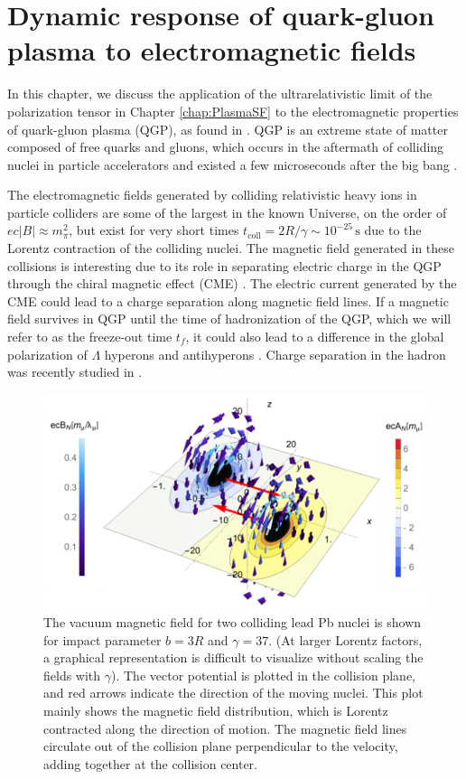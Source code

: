 \section{Dynamic response of quark-gluon plasma to electromagnetic fields}\label{chap:QCD}

 In this chapter, we discuss the application of the ultrarelativistic limit of the polarization tensor in Chapter \ref{chap:PlasmaSF} to the electromagnetic properties of quark-gluon plasma (QGP), as found in \cite{Grayson:2022asf}. QGP is an extreme state of matter composed of free quarks and gluons, which occurs in the aftermath of colliding nuclei in particle accelerators and existed a few microseconds after the big bang \cite{Letessier:2002ony}. 

The electromagnetic fields generated by colliding relativistic heavy ions in particle colliders are some of the largest in the known Universe, on the order of $ec|B| \approx m_\pi^2$, but exist for very short times $t_{\text{coll}}= 2 R/\gamma \sim 10^{-25}\,\textrm{s}$ due to the Lorentz contraction of the colliding nuclei. The magnetic field generated in these collisions is interesting due to its role in separating electric charge in the QGP through the chiral magnetic effect (CME) \cite{Kharzeev:2007jp}. The electric current generated by the CME could lead to a charge separation along magnetic field lines. If a magnetic field survives in QGP until the time of hadronization of the QGP, which we will refer to as the freeze-out time $t_f$, it could also lead to a difference in the global polarization of $\Lambda$ hyperons and antihyperons \cite{Muller:2018ibh}. Charge separation in the hadron was recently studied in \cite{PhysRevX.14.011028}. 

\begin{figure}[h!]
    \centering
    \includegraphics[width=0.85\linewidth]{plots/chap02QCD/Bfield.png}
    \caption{The vacuum magnetic field for two colliding lead Pb nuclei is shown for impact parameter $b=3R$ and $\gamma =37$. (At larger Lorentz factors, a graphical representation is difficult to visualize without scaling the fields with $\gamma$). The vector potential is plotted in the collision plane, and red arrows indicate the direction of the moving nuclei. This plot mainly shows the magnetic field distribution, which is Lorentz contracted along the direction of motion. The magnetic field lines circulate out of the collision plane perpendicular to the velocity, adding together at the collision center.  }
    \label{fig:vacmag}
\end{figure}

